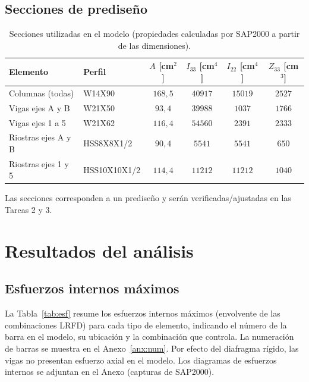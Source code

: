 \documentclass[11pt,letterpaper]{article}
\begin{document}
\subsection{Secciones de prediseño}
\begin{table}[H]
\centering
\caption{Secciones utilizadas en el modelo (propiedades calculadas por SAP2000 a partir de las dimensiones).}
\begin{tabular}{llcccc}
\toprule
Elemento & Perfil & $A$ [cm$^2$] & $I_{33}$ [cm$^4$] & $I_{22}$ [cm$^4$] & $Z_{33}$ [cm$^3$] \\
\midrule
Columnas (todas) & W14X90 & $168{,}5$ & $40917$ & $15019$ & $2527$ \\
Vigas ejes A y B & W21X50 & $93{,}4$ & $39988$ & $1037$ & $1766$ \\
Vigas ejes 1 a 5 & W21X62 & $116{,}4$ & $54560$ & $2391$ & $2333$ \\
Riostras ejes A y B & HSS8X8X1/2 & $90{,}4$ & $5541$ & $5541$ & $650$ \\
Riostras ejes 1 y 5 & HSS10X10X1/2 & $114{,}4$ & $11212$ & $11212$ & $1040$ \\
\bottomrule
\end{tabular}
\end{table}

Las secciones corresponden a un prediseño y serán verificadas/ajustadas en las Tareas 2 y 3.

\section{Resultados del análisis}

\subsection{Esfuerzos internos máximos}
La Tabla~\ref{tab:esf} resume los esfuerzos internos máximos (envolvente de las combinaciones LRFD) para cada
tipo de elemento, indicando el número de la barra en el modelo, su ubicación y la combinación que controla.
La numeración de barras se muestra en el Anexo~\ref{anx:num}. Por efecto del diafragma rígido, las vigas no
presentan esfuerzo axial en el modelo. Los diagramas de esfuerzos internos se adjuntan en el Anexo (capturas de SAP2000).
\end{document}
